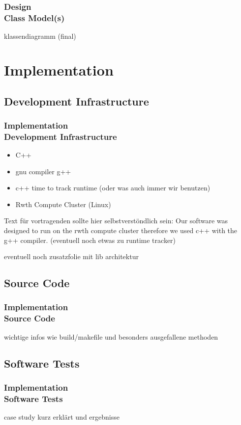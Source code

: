 \documentclass[ucs,10pt]{beamer}
\begin{document}
\begin{frame}
\frametitle{Design \\
	\small \color{rwth-blue} Class Model(s)}
	klassendiagramm (final)
\end{frame}

\section{Implementation}

\subsection{Development Infrastructure}

\begin{frame}
\frametitle{Implementation \\
	\small \color{rwth-blue} Development Infrastructure}
	\begin{itemize}
	\item C++ 
	\item gnu compiler g++
	\item c++ time to track runtime (oder was auch immer wir benutzen)
	\item Rwth Compute Cluster (Linux)
	\end{itemize}
	Text für vortragenden sollte hier selbstverstöndlich sein:
	Our software was designed to run on the rwth compute cluster therefore we used c++ with the g++ compiler. (eventuell noch etwas zu runtime tracker)
	
	eventuell noch zusatzfolie mit lib architektur
\end{frame}

\subsection{Source Code}

\begin{frame}
\frametitle{Implementation \\
	\small \color{rwth-blue} Source Code}
	wichtige infos wie build/makefile und besonders ausgefallene methoden
\end{frame}

\subsection{Software Tests}

\begin{frame}
\frametitle{Implementation \\
	\small \color{rwth-blue} Software Tests}
	case study kurz erklärt und ergebnisse
\end{frame}
\end{document}
